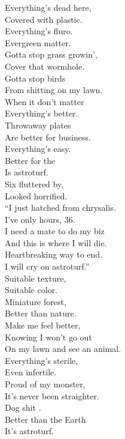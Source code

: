 



Everything's dead here, \\
Covered with plastic. \\
Everything's fluro. \\
Evergreen matter. \\
Gotta stop grass growin', \\
Cover that wormhole. \\
Gotta stop birds \\
From shitting on my lawn. \\
When it don't matter \\
Everything's better. \\
Throwaway plates \\
Are better for business. \\
Everything's easy. \\
Better for the  \\
Is astroturf. \\

Six  fluttered by, \\
Looked horrified. \\
``I just hatched from chrysalis. \\
I've only hours, 36. \\
I need a mate to do my biz \\
And this is where I will die. \\
Heartbreaking way to end. \\
I will cry on astroturf.'' \\

Suitable texture, \\
Suitable color. \\
Miniature forest, \\
Better than nature. \\
Make me feel better, \\
Knowing I won't go out \\
On my lawn and see an animal. \\
Everything's sterile, \\
Even infertile. \\
Proud of my monster, \\
It's never been straighter. \\
Dog shit . \\
Better than the Earth \\
It's astroturf. \\

